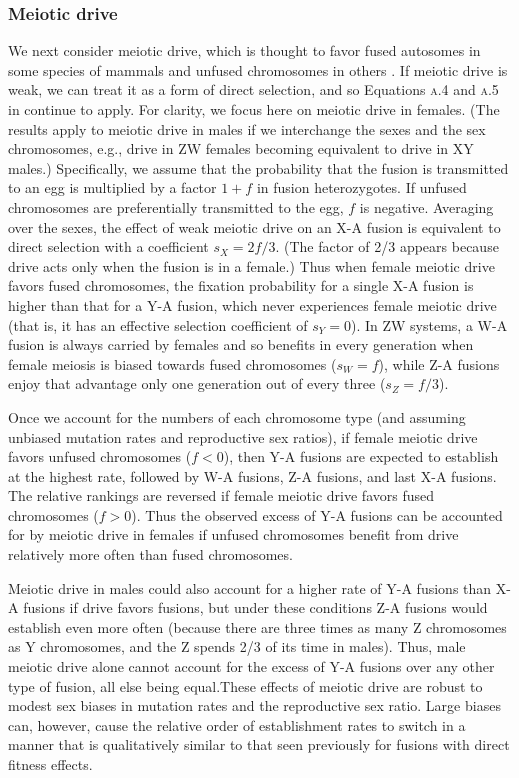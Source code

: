 \subsubsection{Meiotic drive}
We next consider meiotic drive, which is thought to favor fused autosomes in some species of mammals and unfused chromosomes in others \citep{Pardo2001a, Pardo2001b}. If meiotic drive is weak, we can treat it as a form of direct selection, and so Equations \textsc{a.4} and \textsc{a.5} in  continue to apply. For clarity, we focus here on meiotic drive in females. (The results apply to meiotic drive in males if we interchange the sexes and the sex chromosomes, e.g., drive in ZW females becoming equivalent to drive in XY males.) Specifically, we assume that the probability that the fusion is transmitted to an egg is multiplied by a factor $1+f$ in fusion heterozygotes. If unfused chromosomes are preferentially transmitted to the egg, $f$ is negative. Averaging over the sexes, the effect of weak meiotic drive on an X-A fusion is equivalent to direct selection with a coefficient $s_X = \text{2}f/\text{3}$. (The factor of 2/3 appears because drive acts only when the fusion is in a female.) Thus when female meiotic drive favors fused chromosomes, the fixation probability for a single X-A fusion is higher than that for a Y-A fusion, which never experiences female meiotic drive (that is, it has an effective selection coefficient of $s_Y=\text{0}$). In ZW systems, a W-A fusion is always carried by females and so benefits in every generation when female meiosis is biased towards fused chromosomes ($s_W=f$), while Z-A fusions enjoy that advantage only one generation out of every three ($s_Z = f/\text{3}$).
 
Once we account for the numbers of each chromosome type (and assuming unbiased mutation rates and reproductive sex ratios), if female meiotic drive favors unfused chromosomes ($f < \text{0}$), then Y-A fusions are expected to establish at the highest rate, followed by W-A fusions, Z-A fusions, and last X-A fusions. The relative rankings are reversed if female meiotic drive favors fused chromosomes ($f > \text{0}$). Thus the observed excess of Y-A fusions can be accounted for by meiotic drive in females if unfused chromosomes benefit from drive relatively more often than fused chromosomes.

Meiotic drive in males could also account for a higher rate of Y-A fusions than X-A fusions if drive favors fusions, but under these conditions Z-A fusions would establish even more often (because there are three times as many Z chromosomes as Y chromosomes, and the Z spends 2/3 of its time in males). Thus, male meiotic drive alone cannot account for the excess of Y-A fusions over any other type of fusion, all else being equal.These effects of meiotic drive are robust to modest sex biases in mutation rates and the reproductive sex ratio. Large biases can, however, cause the relative order of establishment rates to switch in a manner that is qualitatively similar to that seen previously for fusions with direct fitness effects.

